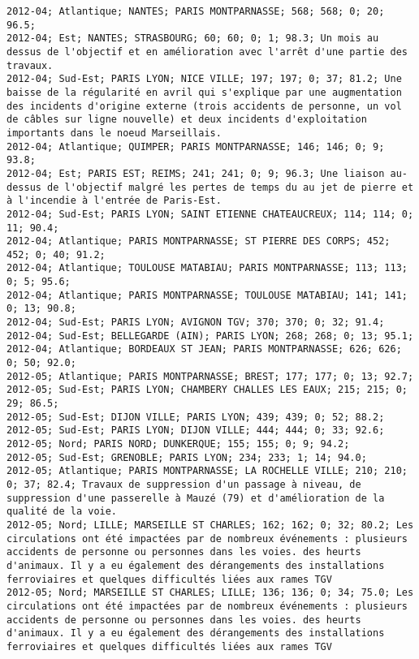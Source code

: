 \documentclass{article}
\begin{document}
\begin{Verbatim}[commandchars=\\\{\}]
2012-04; Atlantique; NANTES; PARIS MONTPARNASSE; 568; 568; 0; 20; 96.5; 
2012-04; Est; NANTES; STRASBOURG; 60; 60; 0; 1; 98.3; Un mois au dessus de l'objectif et en amélioration avec l'arrêt d'une partie des travaux.
2012-04; Sud-Est; PARIS LYON; NICE VILLE; 197; 197; 0; 37; 81.2; Une baisse de la régularité en avril qui s'explique par une augmentation des incidents d'origine externe (trois accidents de personne, un vol de câbles sur ligne nouvelle) et deux incidents d'exploitation importants dans le noeud Marseillais.
2012-04; Atlantique; QUIMPER; PARIS MONTPARNASSE; 146; 146; 0; 9; 93.8; 
2012-04; Est; PARIS EST; REIMS; 241; 241; 0; 9; 96.3; Une liaison au-dessus de l'objectif malgré les pertes de temps du au jet de pierre et à l'incendie à l'entrée de Paris-Est.
2012-04; Sud-Est; PARIS LYON; SAINT ETIENNE CHATEAUCREUX; 114; 114; 0; 11; 90.4; 
2012-04; Atlantique; PARIS MONTPARNASSE; ST PIERRE DES CORPS; 452; 452; 0; 40; 91.2; 
2012-04; Atlantique; TOULOUSE MATABIAU; PARIS MONTPARNASSE; 113; 113; 0; 5; 95.6; 
2012-04; Atlantique; PARIS MONTPARNASSE; TOULOUSE MATABIAU; 141; 141; 0; 13; 90.8; 
2012-04; Sud-Est; PARIS LYON; AVIGNON TGV; 370; 370; 0; 32; 91.4; 
2012-04; Sud-Est; BELLEGARDE (AIN); PARIS LYON; 268; 268; 0; 13; 95.1; 
2012-04; Atlantique; BORDEAUX ST JEAN; PARIS MONTPARNASSE; 626; 626; 0; 50; 92.0; 
2012-05; Atlantique; PARIS MONTPARNASSE; BREST; 177; 177; 0; 13; 92.7; 
2012-05; Sud-Est; PARIS LYON; CHAMBERY CHALLES LES EAUX; 215; 215; 0; 29; 86.5; 
2012-05; Sud-Est; DIJON VILLE; PARIS LYON; 439; 439; 0; 52; 88.2; 
2012-05; Sud-Est; PARIS LYON; DIJON VILLE; 444; 444; 0; 33; 92.6; 
2012-05; Nord; PARIS NORD; DUNKERQUE; 155; 155; 0; 9; 94.2; 
2012-05; Sud-Est; GRENOBLE; PARIS LYON; 234; 233; 1; 14; 94.0; 
2012-05; Atlantique; PARIS MONTPARNASSE; LA ROCHELLE VILLE; 210; 210; 0; 37; 82.4; Travaux de suppression d'un passage à niveau, de suppression d'une passerelle à Mauzé (79) et d'amélioration de la qualité de la voie.
2012-05; Nord; LILLE; MARSEILLE ST CHARLES; 162; 162; 0; 32; 80.2; Les circulations ont été impactées par de nombreux événements : plusieurs accidents de personne ou personnes dans les voies. des heurts d'animaux. Il y a eu également des dérangements des installations ferroviaires et quelques difficultés liées aux rames TGV
2012-05; Nord; MARSEILLE ST CHARLES; LILLE; 136; 136; 0; 34; 75.0; Les circulations ont été impactées par de nombreux événements : plusieurs accidents de personne ou personnes dans les voies. des heurts d'animaux. Il y a eu également des dérangements des installations ferroviaires et quelques difficultés liées aux rames TGV

\end{Verbatim}
\end{document}

